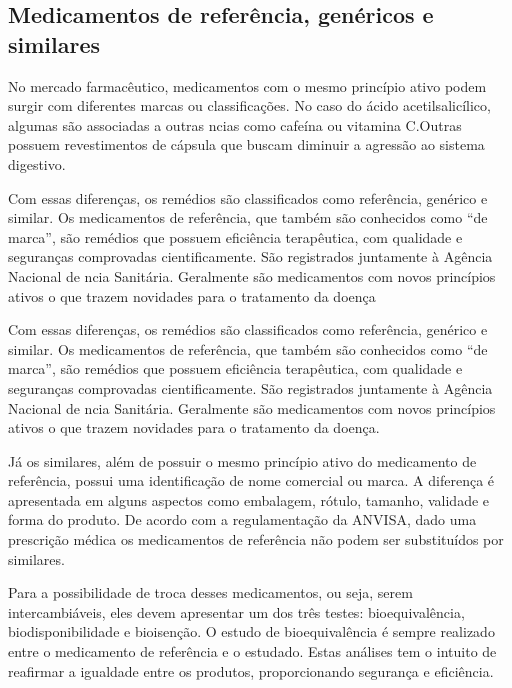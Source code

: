      \subsection{Medicamentos de referência, genéricos e similares}\label{refgensim}
     
     No mercado farmacêutico, medicamentos com o mesmo princípio ativo podem surgir com diferentes marcas ou
     classificações. No caso do ácido acetilsalicílico, algumas são associadas a outras ncias como cafeína ou
     vitamina C.Outras possuem revestimentos de cápsula que buscam diminuir a agressão ao sistema digestivo.
     \cite{prade2006}

     Com essas diferenças, os remédios são classificados como referência, genérico e similar. Os medicamentos
     de referência, que também são conhecidos como “de marca”, são remédios que possuem eficiência
     terapêutica, com qualidade e seguranças comprovadas cientificamente. São registrados juntamente à Agência
     Nacional de ncia Sanitária. Geralmente são medicamentos com novos princípios ativos o que trazem
     novidades para o tratamento da doença

     Com essas diferenças, os remédios são classificados como referência, genérico e similar. Os medicamentos
     de referência, que também são conhecidos como “de marca”, são remédios que possuem eficiência
     terapêutica, com qualidade e seguranças comprovadas cientificamente. São registrados juntamente à Agência
     Nacional de ncia Sanitária. Geralmente são medicamentos com novos princípios ativos o que trazem
     novidades para o tratamento da doença.

     Já os similares, além de possuir o mesmo princípio ativo do medicamento de referência, possui uma
     identificação de nome comercial ou marca. A diferença é apresentada em alguns aspectos como embalagem,
     rótulo, tamanho, validade e forma do produto. De acordo com a regulamentação da ANVISA, dado uma
     prescrição médica os medicamentos de referência não podem ser substituídos por similares.

     Para a possibilidade de troca desses medicamentos, ou seja, serem intercambiáveis, eles devem apresentar
     um dos três testes: bioequivalência, biodisponibilidade e bioisenção. O estudo de bioequivalência é
     sempre realizado entre o medicamento de referência e o estudado. Estas análises tem o intuito de
     reafirmar a igualdade entre os produtos, proporcionando segurança e eficiência. \cite{ache2015}

